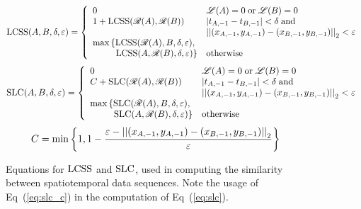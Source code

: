 \begin{figure}
	\centering
	\begin{equation}
		\LCSS(A,B,\delta,\varepsilon)=\left\{\begin{array}{ll}
			0 & \mathscr{L}(A)=0\;\ptxt{or}\;\mathscr{L}(B)=0\\
			1+\LCSS(\mathscr{R}(A),\mathscr{R}(B)) & \abs{t_{A,-1}-t_{B,-1}}<\delta\;\ptxt{and}\;\\
			& \norm{(x_{A,-1},y_{A,-1})-(x_{B,-1},y_{B,-1})}_{2}<\varepsilon\\
			\max\left\{\LCSS(\mathscr{R}(A),B,\delta,\varepsilon),\right.\\
			\phantom{\max\left\{\right.}\!\!\left.\LCSS(A,\mathscr{R}(B),\delta,\varepsilon)\right\} & \ptxt{otherwise}
		\end{array}\right.
		\label{eq:lcss}
	\end{equation}
	\begin{equation}
		\SLC(A,B,\delta,\varepsilon)=\left\{\begin{array}{ll}
			0 & \mathscr{L}(A)=0\;\ptxt{or}\;\mathscr{L}(B)=0\\
			C+\SLC(\mathscr{R}(A),\mathscr{R}(B)) & \abs{t_{A,-1}-t_{B,-1}}<\delta\;\ptxt{and}\;\\
			& \norm{(x_{A,-1},y_{A,-1})-(x_{B,-1},y_{B,-1})}_{2}<\varepsilon\\
			\max\left\{\SLC(\mathscr{R}(A),B,\delta,\varepsilon),\right.\\
			\phantom{\max\left\{\right.}\!\!\left.\SLC(A,\mathscr{R}(B),\delta,\varepsilon)\right\} & \ptxt{otherwise}
		\end{array}\right.
		\label{eq:slc}
	\end{equation}
	\begin{equation}
		C=\min\left\{1,1-\frac{\varepsilon-\left|\left|(x_{A,-1},y_{A,-1})-(x_{B,-1},y_{B,-1})\right|\right|_{2}}{\varepsilon}\right\}
		\label{eq:slc_c}
	\end{equation}
	\caption{Equations for $\operatorname{LCSS}$ and $\operatorname{SLC}$, used in computing the similarity between spatiotemporal data sequences. Note the usage of Eq~(\ref{eq:slc_c}) in the computation of Eq~(\ref{eq:slc}).}
	\label{fig:subsequences}
\end{figure}

